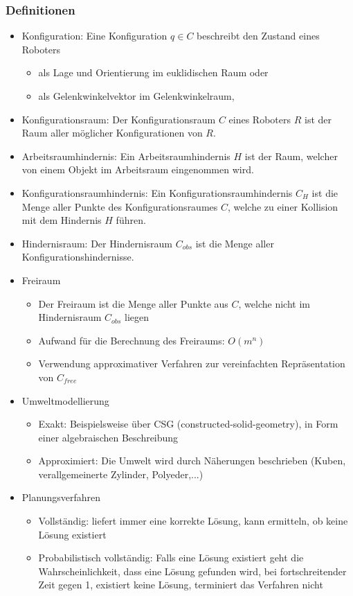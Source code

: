 \documentclass[paper=a4, fontsize=11pt]{scrartcl} %
\numberwithin{equation}{section} %
\numberwithin{figure}{section} %
\numberwithin{table}{section} %
\begin{document}
\subsubsection{Definitionen}

\begin{itemize}
\item Konfiguration: Eine Konfiguration $q \in C$ beschreibt den Zustand eines Roboters
\begin{itemize}
\item als Lage und Orientierung im euklidischen Raum oder
\item als Gelenkwinkelvektor im Gelenkwinkelraum,
\end{itemize}
\item Konfigurationsraum: Der Konfigurationsraum $C$ eines Roboters $R$ ist der Raum aller möglicher Konfigurationen von $R$.
\item Arbeitsraumhindernis: Ein Arbeitsraumhindernis $H$ ist der Raum, welcher von einem Objekt im Arbeitsraum eingenommen wird.
\item Konfigurationsraumhindernis: Ein Konfigurationsraumhindernis $C_H$ ist die Menge aller Punkte des Konfigurationsraumes $C$, welche zu einer Kollision mit dem Hindernis $H$ führen.
\item Hindernisraum: Der Hindernisraum $C_{obs}$ ist die Menge aller Konfigurationshindernisse.
\item Freiraum
\begin{itemize}
\item Der Freiraum ist die Menge aller Punkte aus $C$, welche nicht im Hindernisraum $C_{obs}$ liegen
\item Aufwand für die Berechnung des Freiraums: $O(m^n)$
\item Verwendung approximativer Verfahren zur vereinfachten Repräsentation von $C_{free}$
\end{itemize}
\item{Umweltmodellierung}
\begin{itemize}
\item Exakt: Beispielsweise über CSG (constructed-solid-geometry), in Form einer algebraischen Beschreibung
\item Approximiert: Die Umwelt wird durch Näherungen beschrieben (Kuben, verallgemeinerte Zylinder, Polyeder,...)
\end{itemize}
\item Planungsverfahren
\begin{itemize}
\item Vollständig: liefert immer eine korrekte Lösung, kann ermitteln, ob keine Lösung existiert
\item Probabilistisch vollständig: Falls eine Lösung existiert geht die Wahrscheinlichkeit, dass eine Lösung gefunden wird, bei fortschreitender Zeit gegen 1, existiert keine Lösung, terminiert das Verfahren nicht
\end{itemize}
\end{itemize}
\end{document}
